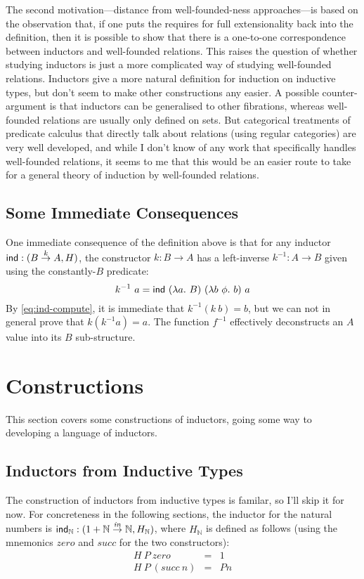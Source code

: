 \documentclass{article}
\newcommand{\inn}{\mathit{in}}
\newcommand{\cons}[1]{\mathit{#1}}
\begin{document}
The second motivation---distance from well-founded-ness
approaches---is based on the observation that, if one puts the
requires for full extensionality back into the definition, then it is
possible to show that there is a one-to-one correspondence between
inductors and well-founded relations. This raises the question of
whether studying inductors is just a more complicated way of studying
well-founded relations. Inductors give a more natural definition for
induction on inductive types, but don't seem to make other
constructions any easier. A possible counter-argument is that
inductors can be generalised to other fibrations, whereas well-founded
relations are usually only defined on sets. But categorical treatments
of predicate calculus that directly talk about relations (using
regular categories) are very well developed, and while I don't know of
any work that specifically handles well-founded relations, it seems to
me that this would be an easier route to take for a general theory of
induction by well-founded relations.

\subsection{Some Immediate Consequences}

One immediate consequence of the definition above is that for any
inductor $\mathsf{ind} : (B \stackrel{k}\to A, H)$, the constructor $k : B \to
A$ has a left-inverse $k^{-1} : A \to B$ given using the
constantly-$B$ predicate:
\begin{displaymath}
  k^{-1}\ a = \ind\ (\lambda a.\ B)\ (\lambda b\ \phi.\ b)\ a
\end{displaymath}
By \autoref{eq:ind-compute}, it is immediate that $k^{-1} (k\ b) = b$,
but we can not in general prove that $k (k^{-1} a) = a$. The function
$f^{-1}$ effectively deconstructs an $A$ value into its $B$
sub-structure.

\section{Constructions}

This section covers some constructions of inductors, going some way to
developing a language of inductors.

\subsection{Inductors from Inductive Types}

The construction of inductors from inductive types is familar, so I'll
skip it for now. For concreteness in the following sections, the
inductor for the natural numbers is $\ind_{\mathbb{N}} : (1 +
\mathbb{N} \stackrel{\inn}\to \mathbb{N}, H_{\mathbb{N}})$, where
$H_{\mathbb{N}}$ is defined as follows (using the mnemonics
$\cons{zero}$ and $\cons{succ}$ for the two constructors):
\begin{eqnarray*}
  H\ P\ \mathit{zero} & = & 1 \\
  H\ P\ (\mathit{succ}\ n) & = & P n
\end{eqnarray*}
\end{document}
